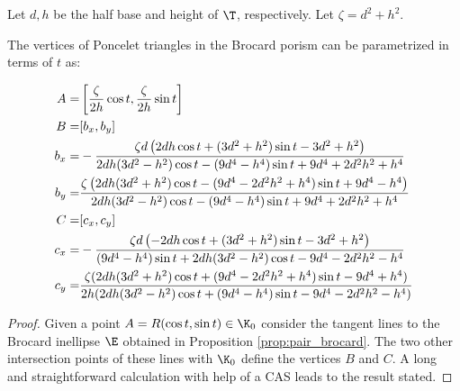 Let $d,h$ be the half base and height of $\T$, respectively. Let $\zeta=d^2+h^2$.

\begin{proposition}
The vertices of Poncelet triangles in the Brocard porism can be parametrized in terms of $t$ as:

 {\small
 \begin{equation}
     \aligned
     A=& \left[ \frac{\zeta}{2h}\cos t, \frac{\zeta}{2h}\sin{t}\right] \\
     B=&[b_x,b_y]\\
     b_x=&
       -\frac{\zeta  d  \left(2 dh \cos{t}   +(3  d^2+h^2)\sin{t}-3  d^2+h^2\right)}{2  d  h  (3  d^2-h^2) \cos{t}-(9d^4-h^4)\sin{t}+ 9d^4+2d^2h^2+h^4}\\
     b_y=& \frac{\zeta    \left(  2 dh(3  d^2+h^2) \cos{t}      - (9  d^4-2  d^2  h^2+h^4)\sin{t} +9  d^4-h^4 \right)}{2  d  h  (3  d^2-h^2)  \cos{t}-(9d^4-h^4) \sin{t}+ 9d^4+2d^2h^2+h^4}\\
     C=&[c_x,c_y]\\
     c_x=&  -\frac{\zeta d\left(-2dh\cos{t} +(3 d^2+h^2)\sin{t}-3d^2+h^2\right)}{(9d^4-h^4)\sin{t}+2dh(3d^2- h^2)\cos{t}-9 d^4-2 d^2 h^2-h^4}\\
     c_y=&\frac{\zeta   (2    d   h   (3   d^2+h^2) \cos{t} +  (9   d^4-2   d^2   h^2+h^4)\sin{t} -9   d^4+h^4)}{
      2   h   (2   d   h   (3   d^2-h^2)   \cos t+ (9   d^4-h^4) \sin {t}-9   d^4-2   d^2   h^2-h^4) } 
     \endaligned
 \end{equation}
 }
 \end{proposition}
 
 \begin{proof} Given a point $A=R(\cos t,\sin t)\in\K_0$ consider the tangent lines to the Brocard inellipse $\E$ obtained in Proposition \ref{prop:pair_brocard}. The two other intersection points of these lines with $\K_0$ define the vertices $B$ and $C$.
 A long and straightforward calculation  with   help of a CAS leads to the result stated.
 \end{proof}
 
 
 
 
   